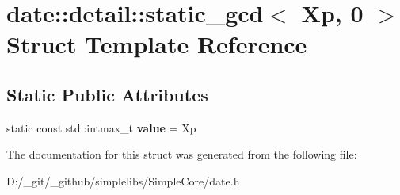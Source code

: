 \hypertarget{structdate_1_1detail_1_1static__gcd_3_01_xp_00_010_01_4}{}\section{date\+::detail\+::static\+\_\+gcd$<$ Xp, 0 $>$ Struct Template Reference}
\label{structdate_1_1detail_1_1static__gcd_3_01_xp_00_010_01_4}
\subsection*{Static Public Attributes}
\begin{DoxyCompactItemize}
\item 
\mbox{\label{structdate_1_1detail_1_1static__gcd_3_01_xp_00_010_01_4_a83eb15b9a0a3cf724461f51e56d9adb8}} 
static const std\+::intmax\+\_\+t {\bfseries value} = Xp
\end{DoxyCompactItemize}


The documentation for this struct was generated from the following file\+:\begin{DoxyCompactItemize}
\item 
D\+:/\+\_\+git/\+\_\+github/simplelibs/\+Simple\+Core/date.\+h\end{DoxyCompactItemize}
